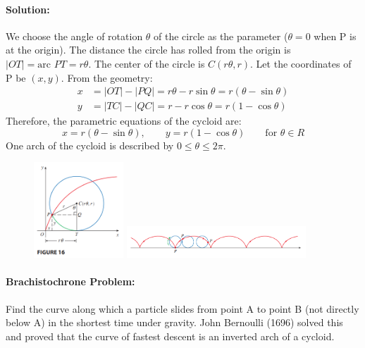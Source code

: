 \documentclass{article}
\begin{document}
\paragraph{Solution:} We choose the angle of rotation $\theta$ of the circle as the parameter ($\theta=0$ when P is at the origin). The distance the circle has rolled from the origin is $|OT| = \text{arc } PT = r\theta$. The center of the circle is $C(r\theta, r)$. Let the coordinates of P be $(x,y)$. From the geometry:
\begin{align*}
    x &= |OT| - |PQ| = r\theta - r\sin\theta = r(\theta - \sin\theta) \\
    y &= |TC| - |QC| = r - r\cos\theta = r(1 - \cos\theta)
\end{align*}
Therefore, the parametric equations of the cycloid are:
\[
 x = r(\theta - \sin\theta), \qquad y = r(1 - \cos\theta) \qquad \text{for } \theta \in {R}
\]
One arch of the cycloid is described by $0 \le \theta \le 2\pi$.
\begin{figure}[htbp]
    \centering
    \includegraphics[width=0.3\textwidth]{graph14.png}
    \includegraphics[width=0.6\textwidth]{graph18.png}
\end{figure}

\paragraph{Brachistochrone Problem:} Find the curve along which a particle slides from point A to point B (not directly below A) in the shortest time under gravity. John Bernoulli (1696) solved this and proved that the curve of fastest descent is an inverted arch of a cycloid.
\end{document}
